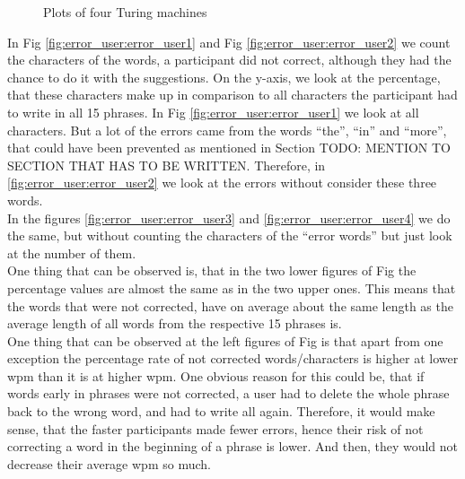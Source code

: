 \begin{figure}[H]
    \caption{Plots of four Turing machines}
    \label{fig:error_user}
\end{figure}

In Fig \cref{fig:error_user:error_user1} and Fig \cref{fig:error_user:error_user2} we count the characters of the words, a participant did not correct, although they had the chance to do it with the suggestions. On the y-axis, we look at the percentage, that these characters make up in comparison to all characters the participant had to write in all 15 phrases. In Fig \cref{fig:error_user:error_user1} we look at all characters. But a lot of the errors came from the words ``the'', ``in'' and ``more'', that could have been prevented as mentioned in Section TODO: MENTION TO SECTION THAT HAS TO BE WRITTEN. Therefore, in \cref{fig:error_user:error_user2} we look at the errors without consider these three words.\\
In the figures \cref{fig:error_user:error_user3} and \cref{fig:error_user:error_user4} we do the same, but without counting the characters of the ``error words'' but just look at the number of them.\\
One thing that can be observed is, that in the two lower figures of Fig  the percentage values are almost the same as in the two upper ones. This means that the words that were not corrected, have on average about the same length as the average length of all words from the respective 15 phrases is.\\
One thing that can be observed at the left figures of Fig  is that apart from one exception the percentage rate of not corrected words/characters is higher at lower wpm than it is at higher wpm. One obvious reason for this could be, that if words early in phrases were not corrected, a user had to delete the whole phrase back to the wrong word, and had to write all again. Therefore, it would make sense, that the faster participants made fewer errors, hence their risk of not correcting a word in the beginning of a phrase is lower. And then, they would not decrease their average wpm so much.

